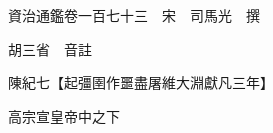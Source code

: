 










 


 
 


 

  
  
  
  
  





  
  
  
  
  
 
  

  

  
  
  



  

 
 

  
   




  

  
  


  　　資治通鑑卷一百七十三　宋　司馬光　撰

　　胡三省　音註

　　陳紀七【起彊圉作噩盡屠維大淵獻凡三年】

　　高宗宣皇帝中之下

